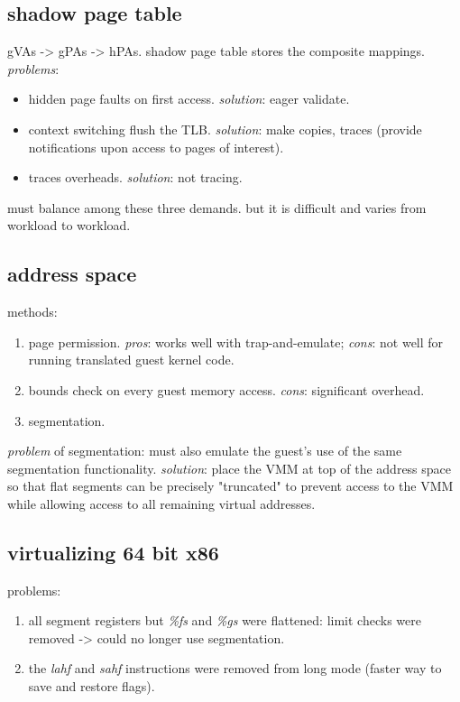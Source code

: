 \documentclass[9pt,conference]{IEEEtran}
\begin{document}
\subsection{shadow page table}
\label{sec-9-1}
gVAs -> gPAs -> hPAs.
shadow page table stores the composite mappings.
\emph{problems}:
\begin{itemize}
\item hidden page faults on first access. \emph{solution}: eager validate.
\item context switching flush the TLB. \emph{solution}: make copies, traces (provide notifications upon access to pages of interest).
\item traces overheads. \emph{solution}: not tracing.
\end{itemize}
must balance among these three demands. but it is difficult and varies from workload to workload.

\subsection{address space}
\label{sec-9-2}
methods:
\begin{enumerate}
\item page permission. \emph{pros}: works well with trap-and-emulate; \emph{cons}: not well for running translated guest kernel code.
\item bounds check on every guest memory access. \emph{cons}: significant overhead.
\item segmentation.
\end{enumerate}
\emph{problem} of segmentation: must also emulate the guest's use of the same segmentation functionality.
\emph{solution}: place the VMM at top of the address space so that flat segments
can be precisely "truncated" to prevent access to the VMM
while allowing access to all remaining virtual addresses.

\subsection{virtualizing 64 bit x86}
\label{sec-9-3}
problems:
\begin{enumerate}
\item all segment registers but \emph{\%fs} and \emph{\%gs} were flattened: limit checks were removed -> could no longer use segmentation.
\item the \emph{lahf} and \emph{sahf} instructions were removed from long mode (faster way to save and restore flags).
\end{enumerate}
\end{document}
